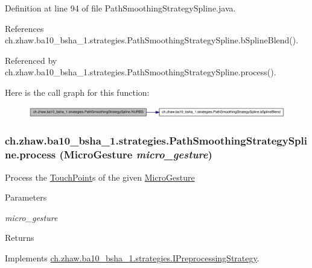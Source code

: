 Definition at line 94 of file PathSmoothingStrategySpline.java.

References ch.zhaw.ba10\_\-bsha\_\-1.strategies.PathSmoothingStrategySpline.bSplineBlend().

Referenced by ch.zhaw.ba10\_\-bsha\_\-1.strategies.PathSmoothingStrategySpline.process().

Here is the call graph for this function:\nopagebreak
\begin{figure}[H]
\begin{center}
\leavevmode
\includegraphics[width=380pt]{classch_1_1zhaw_1_1ba10__bsha__1_1_1strategies_1_1PathSmoothingStrategySpline_af58eb333b4b6ee0e1808b1bd68cbca69_cgraph}
\end{center}
\end{figure}
\hypertarget{classch_1_1zhaw_1_1ba10__bsha__1_1_1strategies_1_1PathSmoothingStrategySpline_ad3e6346b66b88e50ce7c985ff3d99644}{
\subsubsection[{process}]{ ch.zhaw.ba10\_\-bsha\_\-1.strategies.PathSmoothingStrategySpline.process ({\bf MicroGesture} {\em micro\_\-gesture})}}
\label{classch_1_1zhaw_1_1ba10__bsha__1_1_1strategies_1_1PathSmoothingStrategySpline_ad3e6346b66b88e50ce7c985ff3d99644}
Process the \hyperlink{classch_1_1zhaw_1_1ba10__bsha__1_1_1TouchPoint}{TouchPoint}s of the given \hyperlink{}{MicroGesture}


\begin{DoxyParams}{Parameters}
\item[{\em micro\_\-gesture}]\end{DoxyParams}
\begin{DoxyReturn}{Returns}

\end{DoxyReturn}


Implements \hyperlink{interfacech_1_1zhaw_1_1ba10__bsha__1_1_1strategies_1_1IPreprocessingStrategy_a3e3885dce8fda7b79dc514078f11ad62}{ch.zhaw.ba10\_\-bsha\_\-1.strategies.IPreprocessingStrategy}.

